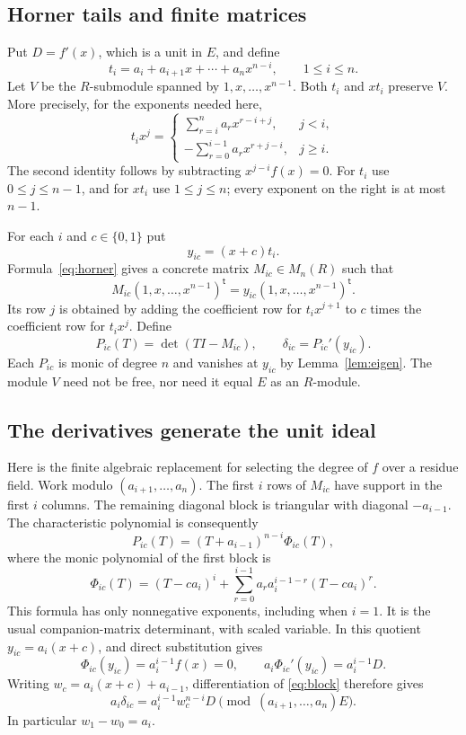 \documentclass[11pt]{article}
\begin{document}
\subsection{Horner tails and finite matrices}

Put $D=f'(x)$, which is a unit in $E$, and define
\[
 t_i=a_i+a_{i+1}x+\cdots+a_nx^{n-i},\qquad 1\leq i\leq n.
\]
Let $V$ be the $R$-submodule spanned by $1,x,\ldots,x^{n-1}$.
Both $t_i$ and $xt_i$ preserve $V$. More precisely, for the exponents
needed here,
\begin{equation}\label{eq:horner}
 t_ix^j=
 \begin{cases}
  \displaystyle\sum_{r=i}^n a_rx^{r-i+j},&j<i,\\[2mm]
  \displaystyle-\sum_{r=0}^{i-1}a_rx^{r+j-i},&j\geq i.
 \end{cases}
\end{equation}
The second identity follows by subtracting $x^{j-i}f(x)=0$.
For $t_i$ use $0\leq j\leq n-1$, and for $xt_i$ use
$1\leq j\leq n$; every exponent on the right is at most $n-1$.

For each $i$ and $c\in\{0,1\}$ put
\[
                      y_{ic}=(x+c)t_i.
\]
Formula~\eqref{eq:horner} gives a concrete matrix $M_{ic}\in M_n(R)$
such that
\[
 M_{ic}(1,x,\ldots,x^{n-1})^{\mathsf t}
       =y_{ic}(1,x,\ldots,x^{n-1})^{\mathsf t}.
\]
Its row $j$ is obtained by adding the coefficient row for $t_ix^{j+1}$
to $c$ times the coefficient row for $t_ix^j$.
Define
\[
 P_{ic}(T)=\det(TI-M_{ic}),\qquad
 \delta_{ic}=P_{ic}'(y_{ic}).
\]
Each $P_{ic}$ is monic of degree $n$ and vanishes at $y_{ic}$ by
Lemma~\ref{lem:eigen}. The module $V$ need not be free, nor need it
equal $E$ as an $R$-module.

\subsection{The derivatives generate the unit ideal}

Here is the finite algebraic replacement for selecting the degree of
$f$ over a residue field. Work modulo $(a_{i+1},\ldots,a_n)$.
The first $i$ rows of $M_{ic}$ have support in the first $i$ columns.
The remaining diagonal block is triangular with diagonal
$-a_{i-1}$. The characteristic polynomial is consequently
\begin{equation}\label{eq:block}
 P_{ic}(T)=(T+a_{i-1})^{n-i}\Phi_{ic}(T),
\end{equation}
where the monic polynomial of the first block is
\[
 \Phi_{ic}(T)=(T-ca_i)^i+
       \sum_{r=0}^{i-1}a_ra_i^{i-1-r}(T-ca_i)^r.
\]
This formula has only nonnegative exponents, including when $i=1$.
It is the usual companion-matrix determinant, with scaled variable.
In this quotient $y_{ic}=a_i(x+c)$, and direct substitution gives
\[
 \Phi_{ic}(y_{ic})=a_i^{i-1}f(x)=0,
 \qquad a_i\Phi_{ic}'(y_{ic})=a_i^{i-1}D.
\]
Writing $w_c=a_i(x+c)+a_{i-1}$, differentiation of
\eqref{eq:block} therefore gives
\begin{equation}\label{eq:derivative-stratum}
 a_i\delta_{ic}=a_i^{i-1}w_c^{n-i}D
                \pmod{(a_{i+1},\ldots,a_n)E}.
\end{equation}
In particular $w_1-w_0=a_i$.
\end{document}
